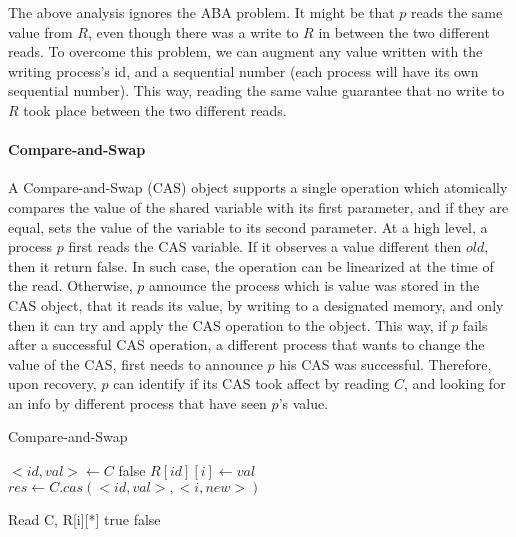 The above analysis ignores the ABA problem. It might be that $p$ reads the same value from $R$, even though there was a write to $R$ in between the two different reads. To overcome this problem, we can augment any value written with the writing process's id, and a sequential number (each process will have its own sequential number). This way, reading the same value guarantee that no write to $R$ took place between the two different reads.


\paragraph*{Compare-and-Swap}

A Compare-and-Swap (CAS) object supports a single operation which atomically compares the value of the shared variable with its first parameter, and if they are equal, sets the value of the variable to its second parameter.
At a high level, a process $p$ first reads the CAS variable. If it observes a value different then $old$, then it return false. In such case, the operation can be linearized at the time of the read. Otherwise, $p$ announce the process which is value was stored in the CAS object, that it reads its value, by writing to a designated memory, and only then it can try and apply the CAS operation to the object. This way, if $p$ fails after a successful CAS operation, a different process that wants to change the value of the CAS, first needs to announce $p$ his CAS was successful. Therefore, upon recovery, $p$ can identify if its CAS took affect by reading $C$, and looking for an info by different process that have seen $p$'s value.
\begin{algorithm}
	\caption{Compare-and-Swap}\label{euclid}
	\begin{algorithmic}[1]
		\State $<id,val> \gets C$
		\State \Return false
		\EndIf
		\State $R[id][i] \gets val$
		\State $res \gets C.cas(<id,val>, <i,new>)$
		\EndProcedure
		
		\State Read C, R[i][*]
		\State \Return true
		\Else {}
		\State \Return false
		\EndIf
		\EndProcedure
	\end{algorithmic}
\end{algorithm}
